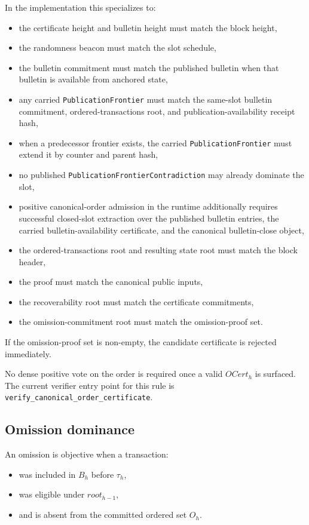 \documentclass[11pt]{article}
\newcommand{\code}[1]{\texttt{#1}}
\begin{document}
In the implementation this specializes to:

\begin{itemize}[leftmargin=1.5em]
\item the certificate height and bulletin height must match the block height,
\item the randomness beacon must match the slot schedule,
\item the bulletin commitment must match the published bulletin when that
bulletin is available from anchored state,
\item any carried \code{PublicationFrontier} must match the same-slot bulletin
commitment, ordered-transactions root, and publication-availability receipt
hash,
\item when a predecessor frontier exists, the carried
\code{PublicationFrontier} must extend it by counter and parent hash,
\item no published \code{PublicationFrontierContradiction} may already dominate
the slot,
\item positive canonical-order admission in the runtime additionally
requires successful closed-slot extraction over the published bulletin entries,
the carried bulletin-availability certificate, and the canonical
bulletin-close object,
\item the ordered-transactions root and resulting state root must match the
block header,
\item the proof must match the canonical public inputs,
\item the recoverability root must match the certificate commitments,
\item the omission-commitment root must match the omission-proof set.
\end{itemize}

If the omission-proof set is non-empty, the candidate certificate is rejected
immediately.

No dense positive vote on the order is required once a valid \(OCert_h\) is
surfaced. The current verifier entry point for this rule is
\code{verify\_canonical\_order\_certificate}.

\subsection{Omission dominance}

An omission is objective when a transaction:

\begin{itemize}[leftmargin=1.5em]
\item was included in \(B_h\) before \(\tau_h\),
\item was eligible under \(root_{h-1}\),
\item and is absent from the committed ordered set \(O_h\).
\end{itemize}
\end{document}
